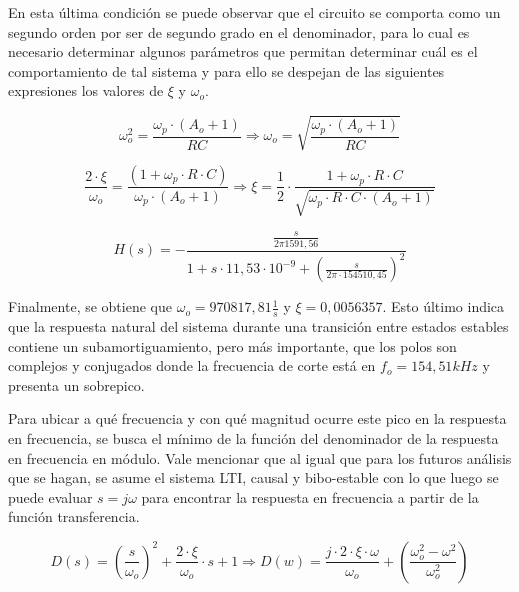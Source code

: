 En esta \'ultima condici\'on se puede observar que el circuito se comporta como un segundo orden por ser de segundo grado en el denominador, para lo cual es necesario determinar algunos par\'ametros que permitan determinar cu\'al es el comportamiento de tal sistema y para ello se despejan de las siguientes expresiones los valores de $\xi$ y $\omega_o$.

\begin{equation*}
	\omega_o^{2} = \frac{\omega_p \cdot (A_o + 1)}{RC} \Rightarrow \omega_o = \sqrt{\frac{\omega_p \cdot (A_o + 1)}{RC}}	
\end{equation*}

\begin{equation*}
	\frac{2 \cdot \xi}{\omega_o} = \frac{(1 + \omega_p \cdot R \cdot C)}{\omega_p \cdot(A_o + 1)}
	\Rightarrow \xi = \frac{1}{2} \cdot \frac{1 + \omega_p \cdot R \cdot C}{\sqrt{\omega_p \cdot R \cdot C \cdot (A_o + 1)}}
\end{equation*}

\begin{equation}
	H(s) = - \frac{\frac{s}{2 \pi 1591,56}}
	{1 + s \cdot 11,53 \cdot 10^{-9} + \left( \frac{s}{2 \pi \cdot 154510,45} \right)^{2}}
\end{equation}

Finalmente, se obtiene que $\omega_o = 970817,81 \frac{1}{s}$ y $\xi = 0,0056357$. Esto \'ultimo indica que la respuesta natural del sistema durante una transici\'on entre estados estables contiene un subamortiguamiento, pero m\'as importante, que los polos son complejos y conjugados donde la frecuencia de corte est\'a en $f_o = 154,51kHz$ y presenta un sobrepico.

Para ubicar a qu\'e frecuencia y con qu\'e magnitud ocurre este pico en la respuesta en frecuencia, se busca el m\'inimo de la funci\'on del denominador de la respuesta en frecuencia en m\'odulo. Vale mencionar que al igual que para los futuros an\'alisis que se hagan, se asume el sistema LTI, causal y bibo-estable con lo que luego se puede evaluar $s = j \omega$ para encontrar la respuesta en frecuencia a partir de la funci\'on transferencia.

\begin{equation*}
	D(s) = \left( \frac{s}{\omega_o} \right)^{2} + \frac{2 \cdot \xi}{\omega_o} \cdot s + 1
	\Rightarrow
	D(w) = \frac{j \cdot 2 \cdot \xi \cdot \omega}{\omega_o} + \left( \frac{\omega_o^{2} - \omega^{2}}{\omega_o^{2}} \right)
\end{equation*}

